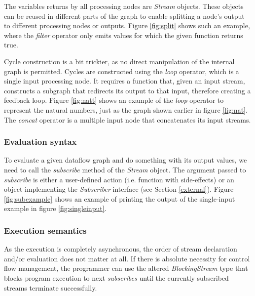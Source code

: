 \documentclass[sigplan,review,anonymous]{acmart}\settopmatter{printfolios=true,printacmref=false}
\begin{document}

The variables returns by all processing nodes are \textit{Stream} objects. These objects can be reused in different parts of the graph to enable splitting a node's output to different processing nodes or outputs. Figure \ref{fig:split} shows such an example, where the \textit{filter} operator only emits values for which the given function returns true.


Cycle construction is a bit trickier, as no direct manipulation of the internal graph is permitted. Cycles are constructed using the \textit{loop} operator, which is a single input processing node. It requires a function that, given an input stream, constructs a subgraph that redirects its output to that input, therefore creating a feedback loop. Figure \ref{fig:natt} shows an example of the \textit{loop} operator to represent the natural numbers, just as the graph shown earlier in figure \ref{fig:nat}. The \textit{concat} operator is a multiple input node that concatenates its input streams.


\subsubsection{Evaluation syntax}

To evaluate a given dataflow graph and do something with its output values, we need to call the \textit{subscribe} method of the \textit{Stream} object. The argument passed to \textit{subscribe} is either a user-defined action (i.e. function with side-effects) or an object implementing the \textit{Subscriber} interface (see Section \ref{external}). Figure \ref{fig:subexample} shows an example of printing the output of the single-input example in figure \ref{fig:singleinput}.


\subsubsection{Execution semantics}

As the execution is completely asynchronous, the order of stream declaration and/or evaluation does not matter at all. If there is absolute necessity for control flow management, the programmer can use the altered \textit{BlockingStream} type that blocks program execution to next \textit{subscribes} until the currently subscribed streams terminate successfully.
\end{document}
